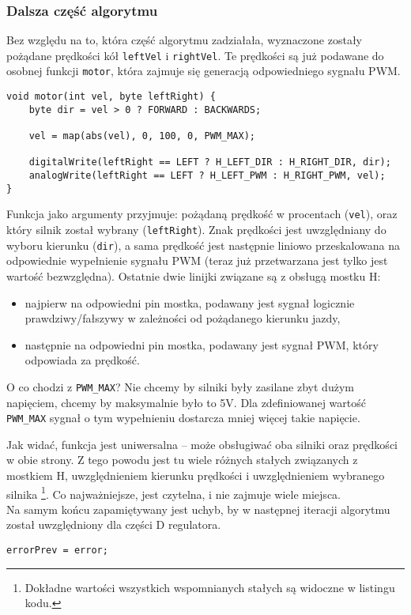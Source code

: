\documentclass[11pt]{article}
\begin{document}
\subsubsection*{Dalsza część algorytmu}
Bez względu na to, która część algorytmu zadziałała, wyznaczone zostały pożądane prędkości kół \texttt{leftVel} i \texttt{rightVel}. Te prędkości są już podawane do osobnej funkcji \texttt{motor}, która zajmuje się generacją odpowiedniego sygnału PWM.
\begin{lstlisting}[firstnumber = 148]
void motor(int vel, byte leftRight) {
    byte dir = vel > 0 ? FORWARD : BACKWARDS;

    vel = map(abs(vel), 0, 100, 0, PWM_MAX);

    digitalWrite(leftRight == LEFT ? H_LEFT_DIR : H_RIGHT_DIR, dir);
    analogWrite(leftRight == LEFT ? H_LEFT_PWM : H_RIGHT_PWM, vel);
}
\end{lstlisting}

Funkcja jako argumenty przyjmuje: pożądaną prędkość w procentach (\texttt{vel}), oraz który silnik został wybrany (\texttt{leftRight}). Znak prędkości jest uwzględniany do wyboru kierunku (\texttt{dir}), a sama prędkość jest następnie liniowo przeskalowana na odpowiednie wypełnienie sygnału PWM (teraz już przetwarzana jest tylko jest wartość bezwzględna). Ostatnie dwie linijki związane są z obsługą mostku H:
\begin{itemize}
\item najpierw na odpowiedni pin mostka, podawany jest sygnał logicznie prawdziwy/fałszywy w zależności od pożądanego kierunku jazdy,
\item następnie na odpowiedni pin mostka, podawany jest sygnał PWM, który odpowiada za prędkość.
\end{itemize}

O co chodzi z \texttt{PWM\_MAX}? Nie chcemy by silniki były zasilane zbyt dużym napięciem, chcemy by maksymalnie było to 5V. Dla zdefiniowanej wartość \texttt{PWM\_MAX} sygnał o tym wypełnieniu dostarcza mniej więcej takie napięcie.

Jak widać, funkcja jest uniwersalna -- może obsługiwać oba silniki oraz prędkości w obie strony. Z tego powodu jest tu wiele różnych stałych związanych z mostkiem H, uwzględnieniem kierunku prędkości i uwzględnieniem wybranego silnika%
\footnote{Dokładne wartości wszystkich wspomnianych stałych są widoczne w listingu kodu.}.
Co najważniejsze, jest czytelna, i nie zajmuje wiele miejsca.\\

Na samym końcu zapamiętywany jest uchyb, by w następnej iteracji algorytmu został uwzględniony dla części D regulatora.
\begin{lstlisting}[firstnumber = 141]
errorPrev = error;
\end{lstlisting}
\end{document}
